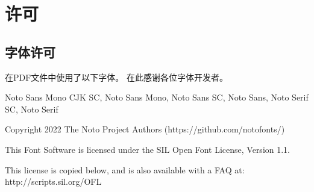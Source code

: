 \chapter*{许可}

\section*{字体许可}

在PDF文件中使用了以下字体。
在此感谢各位字体开发者。

\vspace{1em}

Noto Sans Mono CJK SC, Noto Sans Mono, Noto Sans SC, Noto Sans, Noto Serif SC, Noto Serif

Copyright 2022 The Noto Project Authors (https://github.com/notofonts/)

This Font Software is licensed under the SIL Open Font License,
Version 1.1.

This license is copied below, and is also available with a FAQ at:
http://scripts.sil.org/OFL

